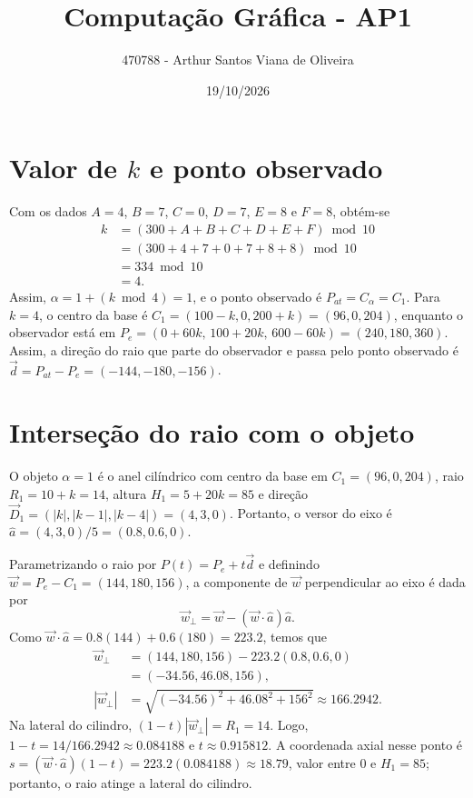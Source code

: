 \documentclass[12pt,a4paper]{article}
\title{Computação Gráfica - AP1}
\author{470788 - Arthur Santos Viana de Oliveira}
\date{19/10/2026}
\begin{document}
\maketitle

\section{Valor de \(k\) e ponto observado}

Com os dados \(A=4\), \(B=7\), \(C=0\), \(D=7\), \(E=8\) e \(F=8\), obtém-se
\begin{align*}
  k &= (300+A+B+C+D+E+F)\bmod 10 \\
    &= (300+4+7+0+7+8+8)\bmod 10 \\
    &= 334\bmod 10 \\
    &= 4.
\end{align*}
Assim, \(\alpha=1+(k\bmod 4)=1\), e o ponto observado é \(P_{at}=C_\alpha=C_1\). Para \(k=4\), o centro da base é \(C_1=(100-k,0,200+k)=(96,0,204)\), enquanto o observador está em \(P_e=(0+60k,\,100+20k,\,600-60k)=(240,180,360)\). Assim, a direção do raio que parte do observador e passa pelo ponto observado é \(\vec d=P_{at}-P_e=(-144,-180,-156)\).

\section{Interseção do raio com o objeto}

O objeto \(\alpha=1\) é o anel cilíndrico com centro da base em \(C_1=(96,0,204)\), raio \(R_1=10+k=14\), altura \(H_1=5+20k=85\) e direção \(\vec D_1=(|k|,|k-1|,|k-4|)=(4,3,0)\). Portanto, o versor do eixo é \(\hat a=(4,3,0)/5=(0.8,0.6,0)\).

Parametrizando o raio por \(P(t)=P_e+t\vec d\) e definindo \(\vec w=P_e-C_1=(144,180,156)\), a componente de \(\vec w\) perpendicular ao eixo é dada por
\[
  \vec w_\perp=\vec w-(\vec w\cdot\hat a)\hat a.
\]
Como \(\vec w\cdot\hat a=0.8(144)+0.6(180)=223.2\), temos que
\begin{align*}
  \vec w_\perp &= (144,180,156)-223.2(0.8,0.6,0) \\
                &= (-34.56,46.08,156), \\
  |\vec w_\perp| &= \sqrt{(-34.56)^2+46.08^2+156^2}\approx166.2942.
\end{align*}
Na lateral do cilindro, \((1-t)|\vec w_\perp|=R_1=14\). Logo, \(1-t=14/166.2942\approx0.084188\) e \(t\approx0.915812\). A coordenada axial nesse ponto é \(s=(\vec w\cdot\hat a)(1-t)=223.2(0.084188)\approx18.79\), valor entre \(0\) e \(H_1=85\); portanto, o raio atinge a lateral do cilindro.
\end{document}
